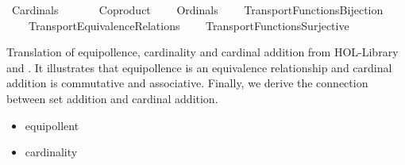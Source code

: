 %
\begin{isabellebody}%
%
%
\isadelimtheory
%
\endisadelimtheory
%
\isatagtheory
{}\isamarkupfalse%
\ Cardinals\isanewline
\ \ \isanewline
\ \ \ \ Coproduct\isanewline
\ \ \ \ Ordinals\isanewline
\ \ \ \ Transport{\isachardot}{\kern0pt}Functions{\isacharunderscore}{\kern0pt}Bijection\isanewline
\ \ \ \ Transport{\isachardot}{\kern0pt}Equivalence{\isacharunderscore}{\kern0pt}Relations\isanewline
\ \ \ \ Transport{\isachardot}{\kern0pt}Functions{\isacharunderscore}{\kern0pt}Surjective\isanewline
{}%
\endisatagtheory
{\isafoldtheory}%
%
\isadelimtheory
%
\endisadelimtheory
%
\isadelimdocument
%
\endisadelimdocument
%
\isatagdocument
%
\isamarkuptrue%
%
\endisatagdocument
{\isafolddocument}%
%
\isadelimdocument
%
\endisadelimdocument
%
\begin{isamarkuptext}%
Translation of equipollence, cardinality and cardinal addition 
from HOL-Library and \cite{ZFC_in_HOL_AFP}.
It illustrates that equipollence is an equivalence relationship and
cardinal addition is commutative and associative. Finally, we derive
the connection between set addition and cardinal addition.%
\end{isamarkuptext}\isamarkuptrue%
%
\isadelimdocument
%
\endisadelimdocument
%
\isatagdocument
%
\isamarkuptrue%
%
\endisatagdocument
{\isafolddocument}%
%
\isadelimdocument
%
\endisadelimdocument
%
\begin{isamarkuptext}%
%
\begin{itemize}%
\item equipollent

\item cardinality


\end{itemize}
\end{isamarkuptext}
\end{isabellebody}
